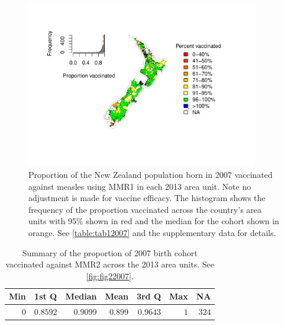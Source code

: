 \documentclass{article}
\begin{document}
\begin{figure}
\begin{center}
\includegraphics[width=0.9\textwidth]{nir_census_MMR1_NIR_2007.pdf}
\end{center}
    \caption{Proportion of the New Zealand population born in 2007 vaccinated against measles using MMR1 in each 2013 area unit. Note no adjustment is made for vaccine efficacy. The histogram shows the frequency of the proportion vaccinated across the country's area units with 95\% shown in red and the median for the cohort shown in orange. See \autoref{table:tab12007} and the supplementary data for details.}
\label{fig:fig12007}
\end{figure}

 \vspace{5mm} %
\begin{table}
\begin{center}
\begin{tabular}{rrrrrrr}
\hline\hline
\multicolumn{1}{c}{Min}&\multicolumn{1}{c}{1st Q}&\multicolumn{1}{c}{Median}&\multicolumn{1}{c}{Mean}&\multicolumn{1}{c}{3rd Q}&\multicolumn{1}{c}{Max}&\multicolumn{1}{c}{NA}\tabularnewline
\hline
$0$&$0.8592$&$0.9099$&$0.899$&$0.9643$&$1$&$324$\tabularnewline
\hline
\end{tabular}\end{center}\caption{Summary of the proportion of 2007 birth cohort vaccinated against MMR2 across the 2013 area units. See \autoref{fig:fig22007}.}
\label{table:tab22007}
\end{table}
\end{document}
